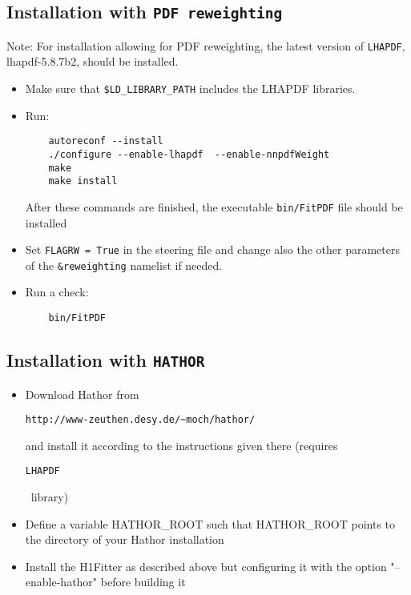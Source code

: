 \subsection{Installation with {\tt PDF reweighting}}\label{sec:install_nnpdfrweight}

Note: For installation allowing for PDF reweighting, the latest version of {\tt LHAPDF}, lhapdf-5.8.7b2, should be installed.

\begin{itemize}
\item Make sure that {\tt \$LD\_LIBRARY\_PATH} includes the LHAPDF libraries.
\item Run:
\begin{verbatim}
    autoreconf --install
    ./configure --enable-lhapdf  --enable-nnpdfWeight
    make 
    make install
\end{verbatim}
After these commands are finished, the executable {\tt bin/FitPDF} 
file should be installed
\item Set {\tt FLAGRW = True} in the steering file and change also the other parameters of the {\tt \&reweighting} namelist if needed.
\item  Run a check:
\begin{verbatim}
    bin/FitPDF 
\end{verbatim}
\end{itemize}


\subsection{Installation with {\tt HATHOR}}

 \begin{itemize}
  \item Download Hathor from 
\begin{verbatim}
http://www-zeuthen.desy.de/~moch/hathor/
\end{verbatim}
     and install it according to the instructions given there
     (requires \begin{verbatim}LHAPDF \end{verbatim}\ library)

  \item Define a variable HATHOR\_ROOT  such that HATHOR\_ROOT  points to the
     directory of your Hathor installation

  \item Install the H1Fitter as described above but configuring it
     with the option "--enable-hathor" before building it
 \end{itemize}


